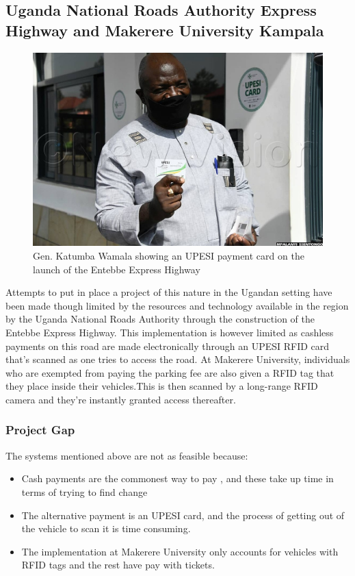 \subsection{Uganda National Roads Authority Express Highway and Makerere University Kampala}

\begin{figure}
    \begin{center}
        \includegraphics[scale = 0.3]{images/katus}
        \caption{Gen. Katumba Wamala showing an UPESI payment card on the launch of the Entebbe Express Highway}
    \end{center}
\end{figure}
Attempts to put in place a project of this nature in the Ugandan setting have been made though limited by the resources and technology available in the region by the Uganda National Roads Authority through the construction of the Entebbe Express Highway. This implementation is however limited as cashless payments on this road are made electronically through an UPESI RFID card that’s scanned as one tries to access the road\cite{unra_news_2022}.
At Makerere University, individuals who are exempted from paying the parking fee are also given a RFID tag that they place inside their vehicles.This is then scanned by a long-range RFID camera and they’re instantly granted access thereafter\cite{wamai_mak_2014}.

\subsubsection{Project Gap}
The systems mentioned above are not as feasible because:
\begin{itemize}
    \item Cash payments are the commonest way to pay , and these take up time in terms of trying to find change
    \item The alternative payment is an UPESI card, and the process of getting out of the vehicle to scan it is time consuming.
    \item The implementation at Makerere University only accounts for vehicles with RFID tags and the rest have pay with tickets.
\end{itemize}

